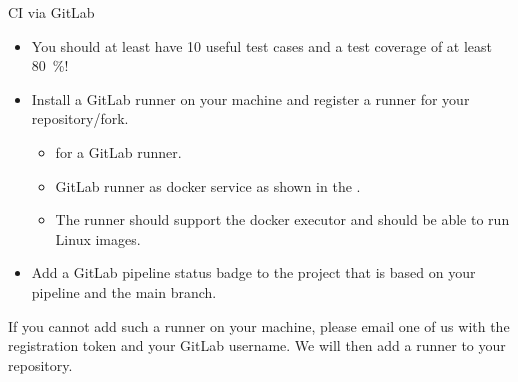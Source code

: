 \begin{frame}{CI via GitLab}

\begin{itemize}
    \item You should at least have 10 useful test cases and a test coverage of at least \SI{80}{\percent}!
    \item Install a GitLab runner on your machine and register a runner for your repository/fork.
    \begin{itemize}
        \item {} for a GitLab runner.
        \item GitLab runner as docker service as shown in the .
        \item The runner should support the docker executor and should be able to run Linux images.
    \end{itemize}
    \item Add a GitLab pipeline status badge to the project that is based on your pipeline and the main branch.
\end{itemize}

If you cannot add such a runner on your machine, please email one of us with the registration token and your GitLab username. We will then add a runner to your repository.

\end{frame}

